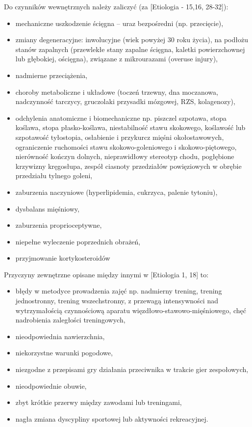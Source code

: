 Do czynników wewnętrznych należy zaliczyć (za [Etiologia - 15,16, 28-32]):
\begin{itemize}
	\item mechaniczne uszkodzenie ścięgna – uraz bezpośredni (np. przecięcie),
	\item zmiany degeneracyjne: inwolucyjne (wiek powyżej 30 roku życia), na podłożu stanów zapalnych (przewlekłe stany zapalne ścięgna, kaletki powierzchownej lub głębokiej, ościęgna), związane z mikrourazami (overuse injury),
	\item nadmierne przeciążenia,
	\item choroby metaboliczne i układowe (toczeń trzewny, dna moczanowa, nadczynność tarczycy, gruczolaki przysadki mózgowej, RZS, kolagenozy),
	\item odchylenia anatomiczne i biomechaniczne np. piszczel szpotawa, stopa koślawa, stopa płasko-koślawa, niestabilność stawu skokowego, koślawość lub szpotawość tyłostopia, osłabienie i przykurcz mięśni okołostawowych, ograniczenie ruchomości stawu skokowo-goleniowego i skokowo-piętowego, nierówność kończyn dolnych, nieprawidłowy stereotyp chodu, pogłębione krzywizny kręgosłupa, zespół ciasnoty przedziałów powięziowych w obrębie przedziału tylnego goleni,
	\item zaburzenia naczyniowe (hyperlipidemia, cukrzyca, palenie tytoniu),
	\item dysbalans mięśniowy,
	\item zaburzenia proprioceptywne,
	\item niepełne wyleczenie poprzednich obrażeń,
	\item przyjmowanie kortykosteroidów
\end{itemize}

Przyczyny zewnętrzne opisane między innymi w [Etiologia 1, 18] to:
\begin{itemize}
	\item błędy w metodyce prowadzenia zajęć np. nadmierny trening, trening jednostronny, trening wszechstronny, z przewagą intensywności nad wytrzymałością czynnościową aparatu więzdłowo-stawowo-mięśniowego, chęć nadrobienia zaległości treningowych,
	\item nieodpowiednia nawierzchnia,
	\item niekorzystne warunki pogodowe,
	\item niezgodne z przepisami gry działania przeciwnika w trakcie gier zespołowych,
	\item nieodpowiednie obuwie,
	\item zbyt krótkie przerwy między zawodami lub treningami,
	\item nagła zmiana dyscypliny sportowej lub aktywności rekreacyjnej.
\end{itemize}

